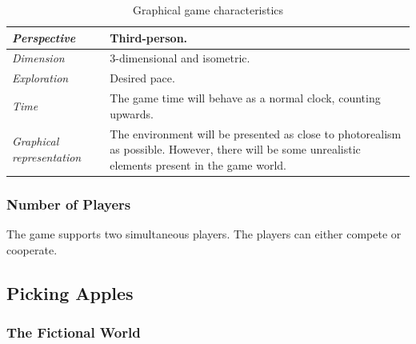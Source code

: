 \begin{table} [H]
\centering
    \begin{tabular}{|p{}|p{}|}
       \hline
      \emph {Perspective} & Third-person. \\ \hline
       \emph{Dimension} &  3-dimensional and isometric. \\ \hline
	       \emph{Exploration} & Desired pace. \\ \hline
	       \emph{Time} & The game time will behave as a normal clock, counting upwards. \\ \hline
	       \emph{Graphical representation} & The environment will be presented as close to photorealism as possible.  However, there will be some unrealistic elements present in the game world.  \\ \hline
    \end{tabular}
    \caption[Graphical game characteristics]{Graphical game characteristics}
    \label{tab:graphical1}
\end{table}  

\subsubsection{Number of Players}
The game supports two simultaneous players. The players can either compete or cooperate.

\subsection{Picking Apples}

\subsubsection{The Fictional World} 

